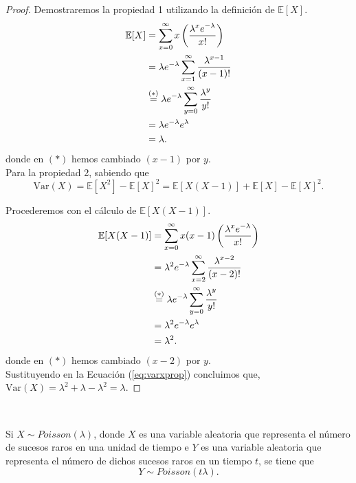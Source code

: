 \documentclass[oneside,openright,titlepage,numbers=noenddot,openany,headinclude,footinclude=true,
cleardoublepage=empty,abstractoff,BCOR=5mm,paper=a4,fontsize=12pt,main=spanish]{scrreprt}
\begin{document}
\begin{proof}
  Demostraremos la propiedad 1 utilizando la definición de $\mathbb{E}[X]$. \\
  \begin{equation*}
  \begin{split}
  \mathbb{E}[X]&=\sum_{x=0}^\infty x \left(\frac{\displaystyle \lambda^x e^{-\lambda}}{\displaystyle x!}\right)\\
  &=\lambda e^{-\lambda} \sum_{x=1}^\infty \frac{\displaystyle \lambda^{x-1}}{\displaystyle (x-1)!}\\
  &\overset{(*)}{=}\lambda e^{-\lambda} \sum_{y=0}^\infty \frac{\displaystyle \lambda^{y}}{\displaystyle y!}\\
  &=\lambda e^{-\lambda} e^{\lambda}\\
  &=\lambda.
  \end{split}
  \end{equation*} donde en $(*)$ hemos cambiado $(x-1)$ por $y$.\\
  
  Para la propiedad 2, sabiendo que
  \begin{equation}\label{eq:varxprop}
    \text{Var}(X)=\mathbb{E}[X^2]-\mathbb{E}[X]^2=\mathbb{E}[X(X-1)]+\mathbb{E}[X]-\mathbb{E}[X]^2.
  \end{equation}
  
  Procederemos con el cálculo de $\mathbb{E}[X(X-1)]$. \begin{equation*}
  \begin{split}
 \mathbb{E}[X(X-1)]&=\sum_{x=0}^\infty x(x-1)\left(\frac{\displaystyle \lambda^x e^{-\lambda}}{\displaystyle x!}\right)\\
 &=\lambda^2 e^{-\lambda} \sum_{x=2}^\infty \frac{\displaystyle \lambda^{x-2}}{\displaystyle (x-2)!}\\ &\overset{(*)}{=}\lambda e^{-\lambda} \sum_{y=0}^\infty \frac{\displaystyle \lambda^{y}}{\displaystyle y!}\\
 &=\lambda^2 e^{-\lambda} e^{\lambda}\\
 &=\lambda^2.
  \end{split}
  \end{equation*} donde en $(*)$ hemos cambiado $(x-2)$ por $y$.\\
  
  Sustituyendo en la Ecuación (\ref{eq:varxprop}) concluimos que, $\text{Var}(X)=\lambda^2+\lambda-\lambda^2=\lambda.$
\end{proof}\

\begin{proposition}
Si $X \sim Poisson(\lambda)$, donde $X$ es una variable aleatoria que representa el número de sucesos raros en una unidad de tiempo e $Y$ es una variable aleatoria que representa el número de dichos sucesos raros en un tiempo $t$, se tiene que $$Y \sim Poisson(t\lambda).$$
\end{proposition}\
\end{document}
